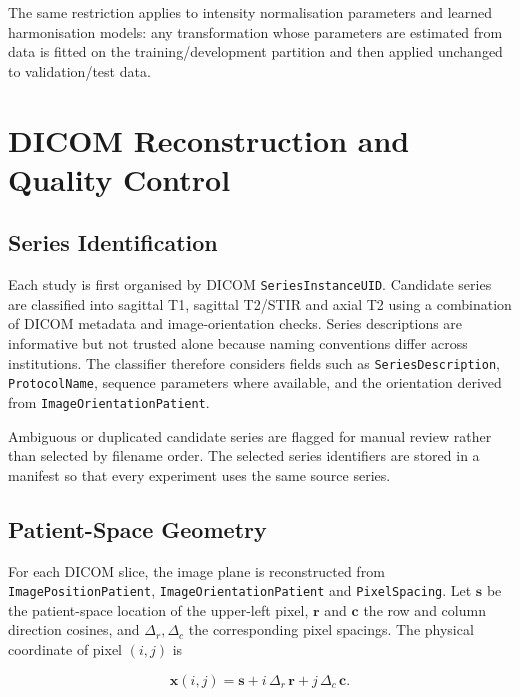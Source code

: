 The same restriction applies to intensity normalisation parameters and learned
harmonisation models: any transformation whose parameters are estimated from
data is fitted on the training/development partition and then applied unchanged
to validation/test data.

\section{DICOM Reconstruction and Quality Control}
\label{sec:method-dicom}

\subsection{Series Identification}
\label{sec:method-series-identification}

Each study is first organised by DICOM \texttt{SeriesInstanceUID}. Candidate
series are classified into sagittal T1, sagittal T2/STIR and axial T2 using a
combination of DICOM metadata and image-orientation checks. Series descriptions
are informative but not trusted alone because naming conventions differ across
institutions. The classifier therefore considers fields such as
\texttt{SeriesDescription}, \texttt{ProtocolName}, sequence parameters where
available, and the orientation derived from \texttt{ImageOrientationPatient}.

Ambiguous or duplicated candidate series are flagged for manual review rather
than selected by filename order. The selected series identifiers are stored in
a manifest so that every experiment uses the same source series.

\subsection{Patient-Space Geometry}
\label{sec:method-geometry}

For each DICOM slice, the image plane is reconstructed from
\texttt{ImagePositionPatient}, \texttt{ImageOrientationPatient} and
\texttt{PixelSpacing}. Let $\mathbf{s}$ be the patient-space location of the
upper-left pixel, $\mathbf{r}$ and $\mathbf{c}$ the row and column direction
cosines, and $\Delta_r,\Delta_c$ the corresponding pixel spacings. The physical
coordinate of pixel $(i,j)$ is

\begin{equation}
\mathbf{x}(i,j)=
\mathbf{s}
+i\,\Delta_r\,\mathbf{r}
+j\,\Delta_c\,\mathbf{c}.
\label{eq:dicom-patient-coordinate}
\end{equation}

